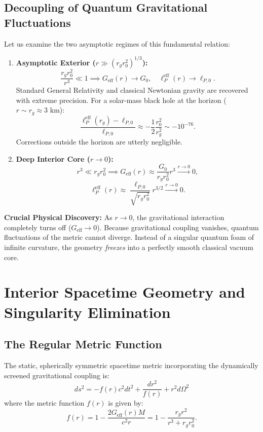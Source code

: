 \documentclass[11pt,a4paper]{article}
\begin{document}
\subsection{Decoupling of Quantum Gravitational Fluctuations}
Let us examine the two asymptotic regimes of this fundamental relation:
\begin{enumerate}
    \item \textbf{Asymptotic Exterior ($r \gg (r_g r_0^2)^{1/3}$):}
    \begin{equation}
    \frac{r_g r_0^2}{r^3} \ll 1 \implies G_{\mathrm{eff}}(r) \to G_0, \quad \ell_P^{\mathrm{eff}}(r) \to \ell_{P,0}.
    \end{equation}
    Standard General Relativity and classical Newtonian gravity are recovered with extreme precision. For a solar-mass black hole at the horizon ($r \sim r_g \approx 3\text{ km}$):
    \begin{equation}
    \frac{\ell_P^{\mathrm{eff}}(r_g) - \ell_{P,0}}{\ell_{P,0}} \approx -\frac{1}{2}\frac{r_0^2}{r_g^2} \sim -10^{-76}.
    \end{equation}
    Corrections outside the horizon are utterly negligible.
    \item \textbf{Deep Interior Core ($r \to 0$):}
    \begin{equation}
    r^3 \ll r_g r_0^2 \implies G_{\mathrm{eff}}(r) \approx \frac{G_0}{r_g r_0^2} r^3 \xrightarrow{r \to 0} 0,
    \end{equation}
    \begin{equation}
    \ell_P^{\mathrm{eff}}(r) \approx \frac{\ell_{P,0}}{\sqrt{r_g r_0^2}} r^{3/2} \xrightarrow{r \to 0} 0.
    \end{equation}
\end{enumerate}

\textbf{Crucial Physical Discovery:} As $r \to 0$, the gravitational interaction completely turns off ($G_{\mathrm{eff}} \to 0$). Because gravitational coupling vanishes, quantum fluctuations of the metric cannot diverge. Instead of a singular quantum foam of infinite curvature, the geometry \textit{freezes} into a perfectly smooth classical vacuum core.

\section{Interior Spacetime Geometry and Singularity Elimination}

\subsection{The Regular Metric Function}
The static, spherically symmetric spacetime metric incorporating the dynamically screened gravitational coupling is:
\begin{equation}
ds^2 = -f(r) c^2 dt^2 + \frac{dr^2}{f(r)} + r^2 d\Omega^2
\end{equation}
where the metric function $f(r)$ is given by:
\begin{equation}
f(r) = 1 - \frac{2 G_{\mathrm{eff}}(r) M}{c^2 r} = 1 - \frac{r_g r^2}{r^3 + r_g r_0^2}.
\end{equation}
\end{document}

